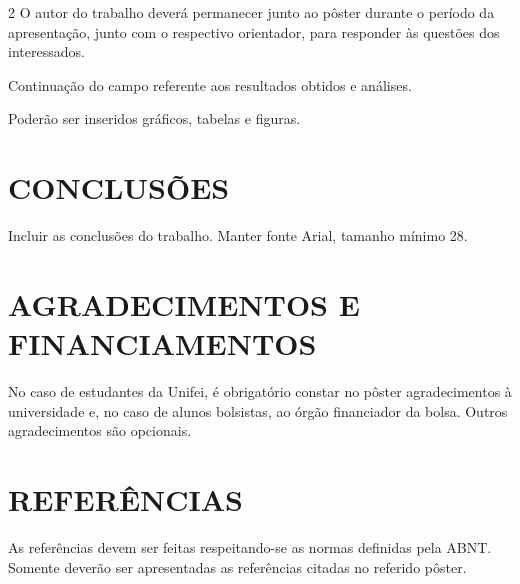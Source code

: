 \documentclass[portrait]{a0poster}
\begin{document}
\begin{multicols}{2}
O autor do trabalho deverá permanecer junto ao pôster durante o período da
apresentação, junto com o respectivo orientador, para responder às questões
dos interessados.

\columnbreak

Continuação do campo referente aos resultados obtidos e análises.

Poderão ser inseridos gráficos, tabelas e figuras.

\vspace{10.0cm}
\section*{CONCLUSÕES}

Incluir as conclusões do trabalho. Manter fonte Arial, tamanho mínimo 28.

\vspace{10.0cm}
\section*{AGRADECIMENTOS E FINANCIAMENTOS}

No caso de estudantes da Unifei, é obrigatório constar no pôster
agradecimentos à universidade e, no caso de alunos bolsistas, ao órgão
financiador da bolsa. Outros agradecimentos são opcionais.

\vspace{2.0cm}
\section*{REFERÊNCIAS}

As referências devem ser feitas respeitando-se as normas definidas pela
ABNT. Somente deverão ser apresentadas as referências citadas no referido
pôster.

\end{multicols}
\end{document}

